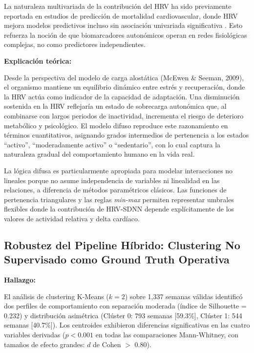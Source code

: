 La naturaleza multivariada de la contribución del HRV ha sido previamente reportada en estudios de predicción de mortalidad cardiovascular, donde HRV mejora modelos predictivos incluso sin asociación univariada significativa \cite{Thayer2010MetaAnalysisHRV}. Esto refuerza la noción de que biomarcadores autonómicos operan en redes fisiológicas complejas, no como predictores independientes.

\textbf{Explicación teórica:}

Desde la perspectiva del modelo de carga alostática (McEwen \& Seeman, 2009), el organismo mantiene un equilibrio dinámico entre estrés y recuperación, donde la HRV actúa como indicador de la capacidad de adaptación. Una disminución sostenida en la HRV reflejaría un estado de sobrecarga autonómica que, al combinarse con largos periodos de inactividad, incrementa el riesgo de deterioro metabólico y psicológico. El modelo difuso reproduce este razonamiento en términos cuantitativos, asignando grados intermedios de pertenencia a los estados ``activo'', ``moderadamente activo'' o ``sedentario'', con lo cual captura la naturaleza gradual del comportamiento humano en la vida real.

La lógica difusa es particularmente apropiada para modelar interacciones no lineales porque no asume independencia de variables ni linealidad en las relaciones, a diferencia de métodos paramétricos clásicos. Las funciones de pertenencia triangulares y las reglas \textit{min-max} permiten representar umbrales flexibles donde la contribución de HRV-SDNN depende explícitamente de los valores de actividad relativa y delta cardíaco.


\subsection{Robustez del Pipeline Híbrido: Clustering No Supervisado como Ground Truth Operativa}
\label{subsec:discusion_clustering_groundtruth}

\textbf{Hallazgo:}

El análisis de clustering K-Means ($k=2$) sobre 1,337 semanas válidas identificó dos perfiles de comportamiento con separación moderada (índice de Silhouette = 0.232) y distribución asimétrica (Clúster 0: 793 semanas [59.3\%], Clúster 1: 544 semanas [40.7\%]). Los centroides exhibieron diferencias significativas en las cuatro variables derivadas ($p < 0.001$ en todas las comparaciones Mann-Whitney, con tamaños de efecto grandes: $d$ de Cohen $>$ 0.80).

